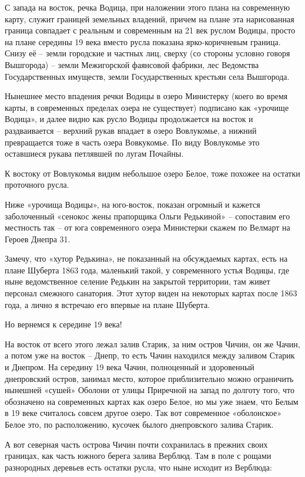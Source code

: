 С запада на восток, речка Водица, при наложении этого плана на современную карту, служит границей земельных владений, причем на плане эта нарисованная граница совпадает с реальным и современным на 21 век руслом Водицы, просто на плане середины 19 века вместо русла показана ярко-коричневым граница. Снизу её – земли городские и частных лиц, сверху (со стороны условно говоря Вышгорода) – земли Межигорской фаянсовой фабрики, лес Ведомства Государственных имуществ, земли Государственных крестьян села Вышгорода.

Нынешнее место впадения речки Водицы в озеро Министерку (коего во время карты, в современных пределах озера не существует) подписано как «урочище Водица», и далее видно как русло Водицы продолжается на восток и раздваивается – верхний рукав впадает в озеро Вовлукомье, а нижний превращается тоже в часть озера Вовкукомье. По виду Вовлукомье это оставшиеся рукава петлявшей по лугам Почайны.

К востоку от Вовлукомья видим небольшое озеро Белое, тоже похожее на остатки проточного русла.

Ниже «урочища Водицы», на юго-восток, показан огромный и кажется заболоченный «сенокос жены прапорщика Ольги Редькиной» – сопоставим его местность так – от юга современного озера Министерки скажем по Велмарт на Героев Днепра 31.

Замечу, что «хутор Редькина», не показанный на обсуждаемых картах, есть на плане Шуберта 1863 года, маленький такой, у современного устья Водицы, где ныне ведомственное селение Редькин на закрытой территории, там живет персонал смежного санатория. Этот хутор виден на некоторых картах после 1863 года, а лично я встречаю его впервые на плане Шуберта.

Но вернемся к середине 19 века!

На восток от всего этого лежал залив Старик, за ним остров Чичин, он же Чачин, а потом уже на восток – Днепр, то есть Чачин находился между заливом Старик и Днепром. На середину 19 века Чачин, полноценный и здоровенный днепровский остров, занимал место, которое приблизительно можно ограничить нынешней «сушей» Оболони от улицы Приречной на запад по долготу того, что обозначено на современных картах как озеро Белое, но мы уже знаем, что Белым в 19 веке считалось совсем другое озеро. Так вот современное «оболонское» Белое это, по расположению, кусочек былого днепровского залива Старик.

А вот северная часть острова Чичин почти сохранилась в прежних своих границах, как часть южного берега залива Верблюд. Там в поле с рощами разнородных деревьев есть остатки русла, что ныне исходит из Верблюда:

